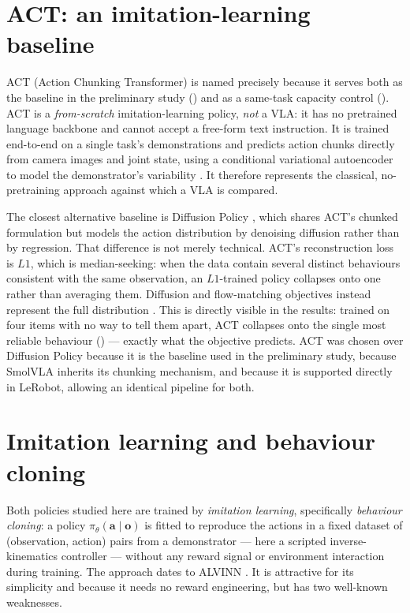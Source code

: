 \section{ACT: an imitation-learning baseline}
\label{sec:bg-act}
ACT (Action Chunking Transformer) is named precisely because it serves both as the
baseline in the preliminary study () and as a same-task
capacity control (). ACT is a \emph{from-scratch}
imitation-learning policy, \emph{not} a VLA: it has no pretrained language backbone and
cannot accept a free-form text instruction. It is trained end-to-end on a single task's
demonstrations and predicts action chunks directly from camera images and joint state,
using a conditional variational autoencoder to model the demonstrator's variability
\parencite{zhao2023act}. It therefore represents the classical, no-pretraining approach
against which a VLA is compared.

The closest alternative baseline is Diffusion Policy
\parencite{chi2023diffusionpolicy}, which shares ACT's chunked formulation but models
the action distribution by denoising diffusion rather than by regression. That
difference is not merely technical. ACT's reconstruction loss is $L1$, which is
median-seeking: when the data contain several distinct behaviours consistent with the
same observation, an $L1$-trained policy collapses onto one rather than averaging them.
Diffusion and flow-matching objectives instead represent the full distribution
\parencite{chi2023diffusionpolicy, lipman2023flowmatching}. This is directly visible in
the results: trained on four items with no way to tell them apart, ACT collapses onto
the single most reliable behaviour () --- exactly what the
objective predicts. ACT was chosen over Diffusion Policy because it is the baseline used
in the preliminary study, because SmolVLA inherits its chunking mechanism, and because
it is supported directly in LeRobot, allowing an identical pipeline for both.

\section{Imitation learning and behaviour cloning}
\label{sec:bg-il}
Both policies studied here are trained by \emph{imitation learning}, specifically
\emph{behaviour cloning}: a policy $\pi_\theta(\mathbf{a}\mid\mathbf{o})$ is fitted to
reproduce the actions in a fixed dataset of (observation, action) pairs from a
demonstrator --- here a scripted inverse-kinematics controller --- without any reward
signal or environment interaction during training. The approach dates to ALVINN
\parencite{pomerleau1988alvinn}. It is attractive for its simplicity and because it
needs no reward engineering, but has two well-known weaknesses.

